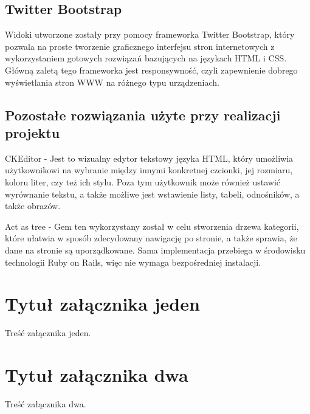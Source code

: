 \documentclass[brudnopis]{xmgr}
\begin{document}
\section{Twitter Bootstrap}
Widoki utworzone zostały przy pomocy frameworka Twitter Bootstrap, który pozwala na proste tworzenie
graficznego interfejsu stron internetowych z wykorzystaniem gotowych rozwiązań bazujących na językach
HTML i CSS. Główną zaletą tego frameworka jest responsywność, czyli zapewnienie dobrego wyświetlania
stron WWW na różnego typu urządzeniach. 

\section{Pozostałe rozwiązania użyte przy realizacji projektu}

CKEditor - Jest to wizualny edytor tekstowy języka HTML, który umożliwia użytkownikowi na wybranie między innymi konkretnej 
czcionki, jej rozmiaru, koloru liter, czy też ich stylu. Poza tym użytkownik może również ustawić wyrównanie tekstu,
a także możliwe jest wstawienie listy, tabeli, odnośników, a także obrazów.

Act as tree - Gem ten wykorzystany został w celu stworzenia drzewa kategorii, które ułatwia w sposób zdecydowany nawigację
po stronie, a także sprawia, że dane na stronie są uporządkowane. Sama implementacja przebiega w środowisku
technologii Ruby on Rails, więc nie wymaga bezpośredniej instalacji.

\summary

\appendix
\chapter{Tytuł załącznika jeden}

Treść załącznika jeden.

\chapter{Tytuł załącznika dwa}

Treść załącznika dwa.




\listoftables

\listoffigures

\oswiadczenie
\end{document}

